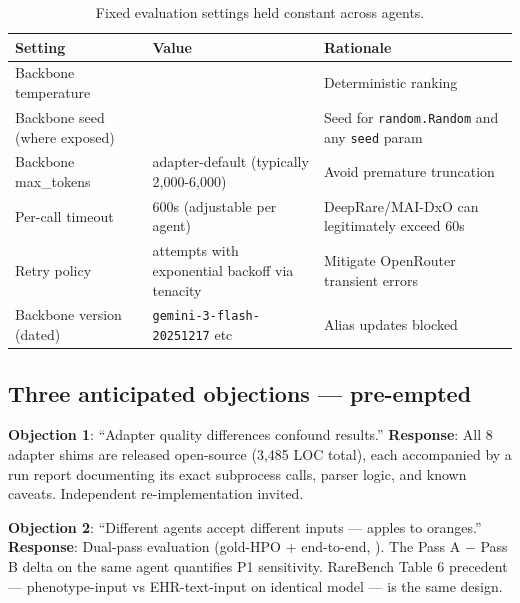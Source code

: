 \begin{table}[t]
\centering\scriptsize\setlength{\tabcolsep}{3.5pt}
\caption{Fixed evaluation settings held constant across agents.}\label{tbl:settings}
\begin{tabular}{@{}
>{\raggedright\arraybackslash}p{}
  >{\raggedright\arraybackslash}p{}
  >{\raggedright\arraybackslash}p{}@{}}
\toprule
\begin{minipage}[b]{\linewidth}\raggedright
Setting
\end{minipage} & \begin{minipage}[b]{\linewidth}\raggedright
Value
\end{minipage} & \begin{minipage}[b]{\linewidth}\raggedright
Rationale
\end{minipage} \\
\midrule
Backbone temperature & 0.0 & Deterministic ranking \\
Backbone seed (where exposed) & 42 & Seed for \texttt{random.Random} and any \texttt{seed} param \\
Backbone max\_tokens & adapter-default (typically 2,000-6,000) & Avoid premature truncation \\
Per-call timeout & 600s (adjustable per agent) & DeepRare/MAI-DxO can legitimately exceed 60s \\
Retry policy & 3 attempts with exponential backoff via tenacity & Mitigate OpenRouter transient errors \\
Backbone version (dated) & \texttt{gemini-3-flash-20251217} etc & Alias updates blocked \\
\bottomrule
\end{tabular}
\end{table}

\subsection{Three anticipated objections --- pre-empted}\label{three-anticipated-objections-pre-empted}

\textbf{Objection 1}: ``Adapter quality differences confound results.''
\textbf{Response}: All 8 adapter shims are released open-source (3,485 LOC total), each accompanied by a run report documenting its exact subprocess calls, parser logic, and known caveats. Independent re-implementation invited.

\textbf{Objection 2}: ``Different agents accept different inputs --- apples to oranges.''
\textbf{Response}: Dual-pass evaluation (gold-HPO + end-to-end, ). The Pass A \ensuremath{-} Pass B delta on the same agent quantifies P1 sensitivity. RareBench Table 6 precedent --- phenotype-input vs EHR-text-input on identical model --- is the same design.

